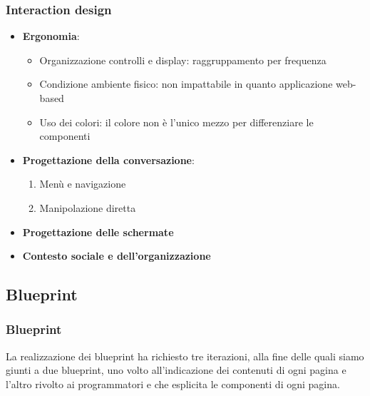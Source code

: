 \documentclass[handout]{beamer}
\begin{document}
		\begin{frame}
			\frametitle{Interaction design}		
			\begin{itemize}[<+->]
				\item \textbf{Ergonomia}:
				\begin{itemize}[<+->]
					\item Organizzazione controlli e display: raggruppamento per frequenza\\
					\item Condizione ambiente fisico: non impattabile in quanto applicazione web-based\\
					\item Uso dei colori: il colore non è l'unico mezzo per differenziare le componenti\\
				\end{itemize} 
				\item \textbf{Progettazione della conversazione}:
					\begin{enumerate}[<+->]
						\item Menù e navigazione
						\item Manipolazione diretta
					\end{enumerate}
				\item \textbf{Progettazione delle schermate}
				\item \textbf{Contesto sociale e dell'organizzazione}
			\end{itemize}
		\end{frame}

		\subsection{Blueprint}
		\begin{frame}
			\frametitle{Blueprint}
			La realizzazione dei blueprint ha richiesto  tre iterazioni, alla fine delle quali siamo giunti a due blueprint, uno volto all'indicazione dei contenuti di ogni pagina e l'altro rivolto ai programmatori e che esplicita le componenti di ogni pagina.
		\end{frame}
\end{document}
